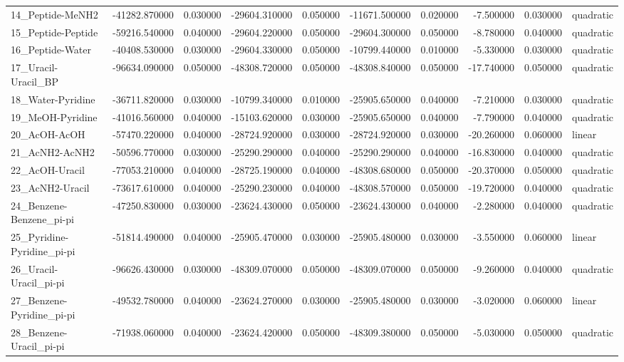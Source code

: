 \begin{tabular}{lrrrrrrrrl}
14_Peptide-MeNH2 & -41282.870000 & 0.030000 & -29604.310000 & 0.050000 & -11671.500000 & 0.020000 & -7.500000 & 0.030000 & quadratic \\
15_Peptide-Peptide & -59216.540000 & 0.040000 & -29604.220000 & 0.050000 & -29604.300000 & 0.050000 & -8.780000 & 0.040000 & quadratic \\
16_Peptide-Water & -40408.530000 & 0.030000 & -29604.330000 & 0.050000 & -10799.440000 & 0.010000 & -5.330000 & 0.030000 & quadratic \\
17_Uracil-Uracil_BP & -96634.090000 & 0.050000 & -48308.720000 & 0.050000 & -48308.840000 & 0.050000 & -17.740000 & 0.050000 & quadratic \\
18_Water-Pyridine & -36711.820000 & 0.030000 & -10799.340000 & 0.010000 & -25905.650000 & 0.040000 & -7.210000 & 0.030000 & quadratic \\
19_MeOH-Pyridine & -41016.560000 & 0.040000 & -15103.620000 & 0.030000 & -25905.650000 & 0.040000 & -7.790000 & 0.040000 & quadratic \\
20_AcOH-AcOH & -57470.220000 & 0.040000 & -28724.920000 & 0.030000 & -28724.920000 & 0.030000 & -20.260000 & 0.060000 & linear \\
21_AcNH2-AcNH2 & -50596.770000 & 0.030000 & -25290.290000 & 0.040000 & -25290.290000 & 0.040000 & -16.830000 & 0.040000 & quadratic \\
22_AcOH-Uracil & -77053.210000 & 0.040000 & -28725.190000 & 0.040000 & -48308.680000 & 0.050000 & -20.370000 & 0.050000 & quadratic \\
23_AcNH2-Uracil & -73617.610000 & 0.040000 & -25290.230000 & 0.040000 & -48308.570000 & 0.050000 & -19.720000 & 0.040000 & quadratic \\
24_Benzene-Benzene_pi-pi & -47250.830000 & 0.030000 & -23624.430000 & 0.050000 & -23624.430000 & 0.040000 & -2.280000 & 0.040000 & quadratic \\
25_Pyridine-Pyridine_pi-pi & -51814.490000 & 0.040000 & -25905.470000 & 0.030000 & -25905.480000 & 0.030000 & -3.550000 & 0.060000 & linear \\
26_Uracil-Uracil_pi-pi & -96626.430000 & 0.030000 & -48309.070000 & 0.050000 & -48309.070000 & 0.050000 & -9.260000 & 0.040000 & quadratic \\
27_Benzene-Pyridine_pi-pi & -49532.780000 & 0.040000 & -23624.270000 & 0.030000 & -25905.480000 & 0.030000 & -3.020000 & 0.060000 & linear \\
28_Benzene-Uracil_pi-pi & -71938.060000 & 0.040000 & -23624.420000 & 0.050000 & -48309.380000 & 0.050000 & -5.030000 & 0.050000 & quadratic \\

\end{tabular}
